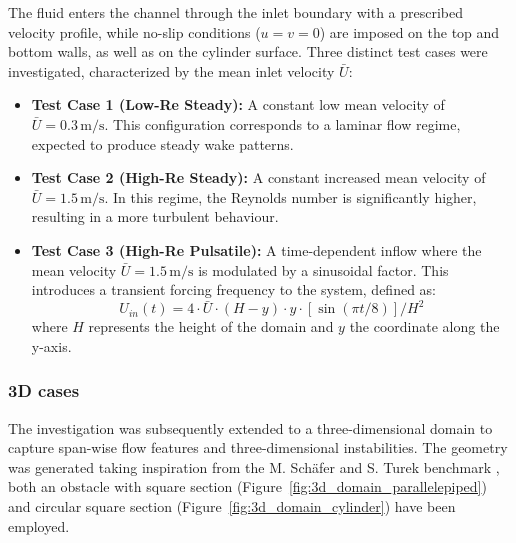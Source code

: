 \documentclass[11pt,a4paper]{article}
\renewcommand{\vec}[1]{\underline{#1}} %
\begin{document}
\begin{center}
\label{fig:2d_domain}
\end{center}

 The fluid enters the channel through the inlet boundary with a prescribed velocity profile, while no-slip conditions ($u=v=0$) are imposed on the top and bottom walls, as well as on the cylinder surface. Three distinct test cases were investigated, characterized by the mean inlet velocity $\bar{U}$:

\begin{itemize}
    \item \textbf{Test Case 1 (Low-Re Steady):} A constant low mean velocity of $\bar{U} = 0.3\,\text{m/s}$. This configuration corresponds to a laminar flow regime, expected to produce steady wake patterns.
    
    \item \textbf{Test Case 2 (High-Re Steady):} A constant increased mean velocity of $\bar{U} = 1.5\,\text{m/s}$. In this regime, the Reynolds number is significantly higher, resulting in a more turbulent behaviour.
    
    \item \textbf{Test Case 3 (High-Re Pulsatile):} A time-dependent inflow where the mean velocity $\bar{U} = 1.5\,\text{m/s}$ is modulated by a sinusoidal factor. This introduces a transient forcing frequency to the system, defined as:
    \begin{equation}
    \label{eq:inlet_velocity_2D}
        U_{in}(t) = 4 \cdot \bar{U} \cdot (H - y) \cdot y \cdot\left[\sin(\pi t/8  )  \right] / H^2
    \end{equation}
    where $H$ represents the height of the domain and $y$ the coordinate along the y-axis.
\end{itemize}

\subsubsection{3D cases}
\noindent The investigation was subsequently extended to a three-dimensional domain to capture span-wise flow features and three-dimensional instabilities. The geometry was generated taking inspiration from the M. Schäfer and S. Turek benchmark \cite{Schafer1996}, both an obstacle with square section (Figure~\ref{fig:3d_domain_parallelepiped}) and circular square section (Figure~\ref{fig:3d_domain_cylinder}) have been employed. \\
\end{document}
